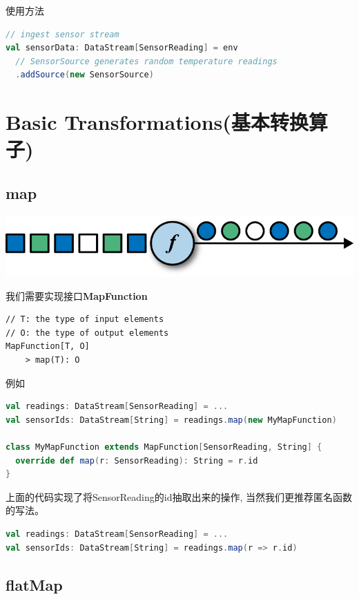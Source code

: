 \documentclass[oneside]{ctexbook}
\begin{document}
使用方法

\begin{lstlisting}[language=scala, breaklines]
// ingest sensor stream
val sensorData: DataStream[SensorReading] = env
  // SensorSource generates random temperature readings
  .addSource(new SensorSource)
\end{lstlisting}

\section{Basic Transformations(基本转换算子)}

\subsection{map}

\noindent \includegraphics[width=\textwidth]{map.png}

我们需要实现接口\textbf{MapFunction}

\begin{lstlisting}
// T: the type of input elements
// O: the type of output elements
MapFunction[T, O]
    > map(T): O
\end{lstlisting}

例如

\begin{lstlisting}[language=scala, breaklines]
val readings: DataStream[SensorReading] = ...
val sensorIds: DataStream[String] = readings.map(new MyMapFunction)

class MyMapFunction extends MapFunction[SensorReading, String] {
  override def map(r: SensorReading): String = r.id
}
\end{lstlisting}

上面的代码实现了将SensorReading的id抽取出来的操作, 当然我们更推荐匿名函数的写法。

\begin{lstlisting}[language=scala, breaklines]
val readings: DataStream[SensorReading] = ...
val sensorIds: DataStream[String] = readings.map(r => r.id)
\end{lstlisting}

\subsection{flatMap}
\end{document}
